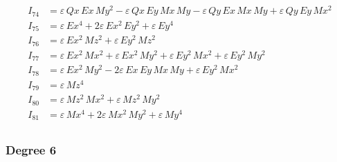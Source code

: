 \documentclass{article}
\begin{document}
\begin{align*}
I_{74} &= ε\,Qx\,Ex\,My^{2} -ε\,Qx\,Ey\,Mx\,My -ε\,Qy\,Ex\,Mx\,My + ε\,Qy\,Ey\,Mx^{2} \\
I_{75} &= ε\,Ex^{4} + 2ε\,Ex^{2}\,Ey^{2} + ε\,Ey^{4} \\
I_{76} &= ε\,Ex^{2}\,Mz^{2} + ε\,Ey^{2}\,Mz^{2} \\
I_{77} &= ε\,Ex^{2}\,Mx^{2} + ε\,Ex^{2}\,My^{2} + ε\,Ey^{2}\,Mx^{2} + ε\,Ey^{2}\,My^{2} \\
I_{78} &= ε\,Ex^{2}\,My^{2} - 2ε\,Ex\,Ey\,Mx\,My + ε\,Ey^{2}\,Mx^{2} \\
I_{79} &= ε\,Mz^{4} \\
I_{80} &= ε\,Mz^{2}\,Mx^{2} + ε\,Mz^{2}\,My^{2} \\
I_{81} &= ε\,Mx^{4} + 2ε\,Mx^{2}\,My^{2} + ε\,My^{4} \\
\end{align*}

\subsubsection*{Degree 6}
\end{document}
